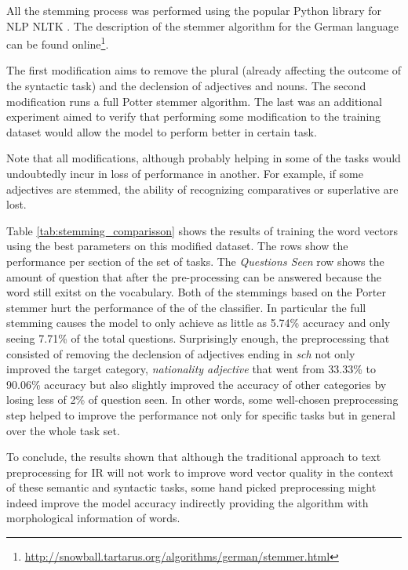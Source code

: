 All the stemming process was performed using the popular Python library for
\ac{NLP}  \ac{NLTK} \cite{BirdKleinLoper09}. The
description of the stemmer algorithm for the German language can be found
online\footnote{\url{http://snowball.tartarus.org/algorithms/german/stemmer.html}}.

The first modification aims to remove the plural (already affecting the
outcome of the syntactic task) and the declension of adjectives and nouns.
The second modification runs a full Potter stemmer algorithm. The last was an
additional experiment aimed to verify that performing some modification to the
training dataset would allow the model to perform better in certain task.

Note that all modifications, although probably helping in some of the tasks
would undoubtedly incur in loss of performance in another. For example, if
some adjectives are stemmed, the ability of recognizing comparatives or
superlative are lost.

Table \ref{tab:stemming_comparisson} shows the results of training the word vectors
using the  best parameters on this modified dataset.  The rows show the
performance per section of the set of tasks. The \textit{Questions Seen} row
shows the amount of question that after the pre-processing can be answered
because the word still exitst on the vocabulary. 
Both of the stemmings based on the Porter stemmer hurt the performance of the
of the classifier. In particular the full stemming causes the model to only
achieve as little as 5.74\% accuracy and only seeing 7.71\% of the total
questions. Surprisingly enough, the preprocessing that consisted of removing
the declension of adjectives  ending in \textit{sch} not only
improved the target category, \textit{nationality adjective} that went from
33.33\% to 90.06\% accuracy but also slightly improved the accuracy of other
categories by losing less of 2\% of question seen. In other words, some
well-chosen preprocessing  step helped to improve the performance not only
for specific tasks but in general over the whole task set.

To conclude, the results shown that although the traditional approach to text
preprocessing for \ac{IR} will not work to improve word vector quality in the
context of these semantic and syntactic tasks,  some hand picked
preprocessing might indeed improve the  model accuracy indirectly providing
the algorithm with morphological information  of words.


